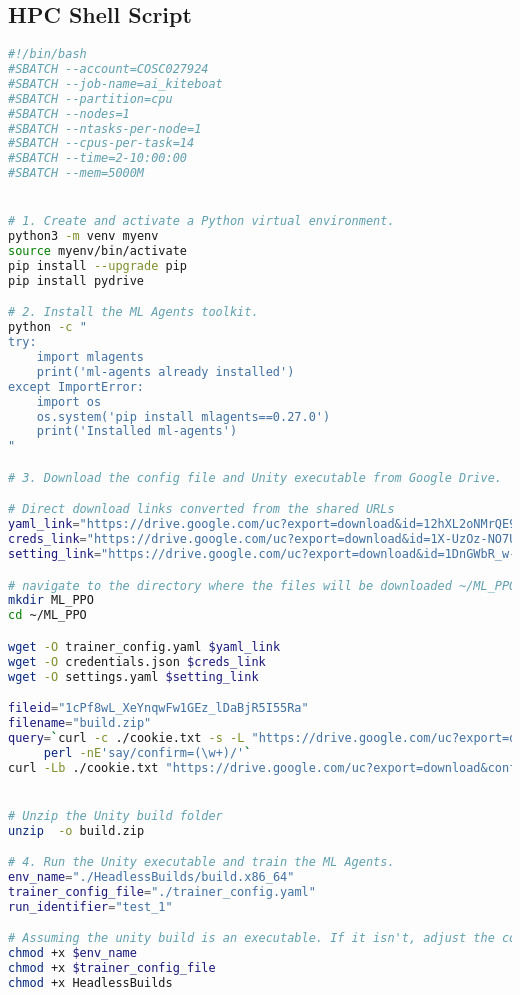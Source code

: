   \subsection{HPC Shell Script}\label{sec:shell_script}
  \begin{lstlisting}[language=bash]
    #!/bin/bash
#SBATCH --account=COSC027924
#SBATCH --job-name=ai_kiteboat
#SBATCH --partition=cpu
#SBATCH --nodes=1
#SBATCH --ntasks-per-node=1
#SBATCH --cpus-per-task=14
#SBATCH --time=2-10:00:00
#SBATCH --mem=5000M


# 1. Create and activate a Python virtual environment.
python3 -m venv myenv
source myenv/bin/activate
pip install --upgrade pip
pip install pydrive

# 2. Install the ML Agents toolkit.
python -c "
try:
    import mlagents
    print('ml-agents already installed')
except ImportError:
    import os
    os.system('pip install mlagents==0.27.0')
    print('Installed ml-agents')
"

# 3. Download the config file and Unity executable from Google Drive.

# Direct download links converted from the shared URLs
yaml_link="https://drive.google.com/uc?export=download&id=12hXL2oNMrQE9hX3fg5O9H7bU8KZkuFI7"
creds_link="https://drive.google.com/uc?export=download&id=1X-UzOz-NO7U8P_m0qXU3fAfHbgLomIyc"
setting_link="https://drive.google.com/uc?export=download&id=1DnGWbR_w-MVa3KsxsGaJ_OcvgAavKut3"

# navigate to the directory where the files will be downloaded ~/ML_PPO
mkdir ML_PPO
cd ~/ML_PPO

wget -O trainer_config.yaml $yaml_link
wget -O credentials.json $creds_link
wget -O settings.yaml $setting_link

fileid="1cPf8wL_XeYnqwFw1GEz_lDaBjR5I55Ra"
filename="build.zip"
query=`curl -c ./cookie.txt -s -L "https://drive.google.com/uc?export=download&id=${fileid}" |\
     perl -nE'say/confirm=(\w+)/'`
curl -Lb ./cookie.txt "https://drive.google.com/uc?export=download&confirm=${query}&id=${fileid}" -o ${filename}


# Unzip the Unity build folder
unzip  -o build.zip 

# 4. Run the Unity executable and train the ML Agents.
env_name="./HeadlessBuilds/build.x86_64"
trainer_config_file="./trainer_config.yaml"
run_identifier="test_1"

# Assuming the unity build is an executable. If it isn't, adjust the command to execute it appropriately.
chmod +x $env_name 
chmod +x $trainer_config_file
chmod +x HeadlessBuilds


\end{lstlisting}
